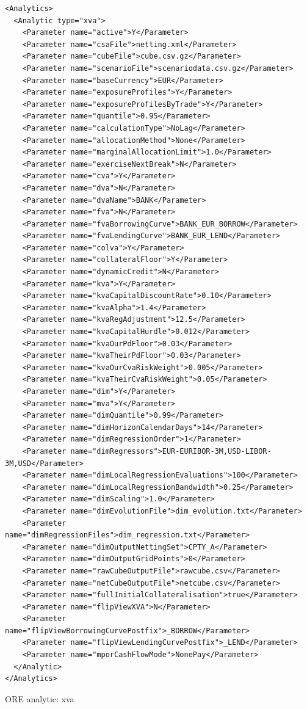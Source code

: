 \documentclass[12pt, a4paper]{article}
\begin{document}
\begin{listing}[H]
\begin{verbatim}
<Analytics>
  <Analytic type="xva">
    <Parameter name="active">Y</Parameter>
    <Parameter name="csaFile">netting.xml</Parameter>
    <Parameter name="cubeFile">cube.csv.gz</Parameter>
    <Parameter name="scenarioFile">scenariodata.csv.gz</Parameter>
    <Parameter name="baseCurrency">EUR</Parameter>
    <Parameter name="exposureProfiles">Y</Parameter>
    <Parameter name="exposureProfilesByTrade">Y</Parameter>
    <Parameter name="quantile">0.95</Parameter>
    <Parameter name="calculationType">NoLag</Parameter>      
    <Parameter name="allocationMethod">None</Parameter>    
    <Parameter name="marginalAllocationLimit">1.0</Parameter>
    <Parameter name="exerciseNextBreak">N</Parameter>
    <Parameter name="cva">Y</Parameter>
    <Parameter name="dva">N</Parameter>
    <Parameter name="dvaName">BANK</Parameter>
    <Parameter name="fva">N</Parameter>
    <Parameter name="fvaBorrowingCurve">BANK_EUR_BORROW</Parameter>
    <Parameter name="fvaLendingCurve">BANK_EUR_LEND</Parameter>
    <Parameter name="colva">Y</Parameter>
    <Parameter name="collateralFloor">Y</Parameter>
    <Parameter name="dynamicCredit">N</Parameter>
    <Parameter name="kva">Y</Parameter>
    <Parameter name="kvaCapitalDiscountRate">0.10</Parameter>
    <Parameter name="kvaAlpha">1.4</Parameter>
    <Parameter name="kvaRegAdjustment">12.5</Parameter>
    <Parameter name="kvaCapitalHurdle">0.012</Parameter>
    <Parameter name="kvaOurPdFloor">0.03</Parameter>
    <Parameter name="kvaTheirPdFloor">0.03</Parameter>
    <Parameter name="kvaOurCvaRiskWeight">0.005</Parameter>
    <Parameter name="kvaTheirCvaRiskWeight">0.05</Parameter>
    <Parameter name="dim">Y</Parameter>
    <Parameter name="mva">Y</Parameter>
    <Parameter name="dimQuantile">0.99</Parameter>
    <Parameter name="dimHorizonCalendarDays">14</Parameter>
    <Parameter name="dimRegressionOrder">1</Parameter>
    <Parameter name="dimRegressors">EUR-EURIBOR-3M,USD-LIBOR-3M,USD</Parameter>
    <Parameter name="dimLocalRegressionEvaluations">100</Parameter>
    <Parameter name="dimLocalRegressionBandwidth">0.25</Parameter>
    <Parameter name="dimScaling">1.0</Parameter>
    <Parameter name="dimEvolutionFile">dim_evolution.txt</Parameter>
    <Parameter name="dimRegressionFiles">dim_regression.txt</Parameter>
    <Parameter name="dimOutputNettingSet">CPTY_A</Parameter>      
    <Parameter name="dimOutputGridPoints">0</Parameter>
    <Parameter name="rawCubeOutputFile">rawcube.csv</Parameter>
    <Parameter name="netCubeOutputFile">netcube.csv</Parameter>
    <Parameter name="fullInitialCollateralisation">true</Parameter>
    <Parameter name="flipViewXVA">N</Parameter>
    <Parameter name="flipViewBorrowingCurvePostfix">_BORROW</Parameter>
    <Parameter name="flipViewLendingCurvePostfix">_LEND</Parameter>
    <Parameter name="mporCashFlowMode">NonePay</Parameter>
  </Analytic>
</Analytics>
\end{verbatim}
\caption{ORE analytic: xva}
\label{lst:ore_xva}
\end{listing}
\end{document}
